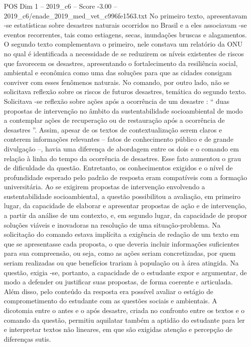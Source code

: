 \begin{textsample}{POS Dim 1 – 2019\_c6 – Score -3.00 – 2019\_c6/enade\_2019\_med\_vet\_c996fe1563.txt}
No primeiro texto, apresentavam -se estatísticas sobre desastres naturais ocorridos no Brasil e a eles associavam -se eventos recorrentes, tais como estiagens, secas, inundações bruscas e alagamentos.
O segundo texto complementava o primeiro, nele constava um relatório da ONU no qual é identificada a necessidade de se reduzirem os níveis existentes de riscos que favorecem os desastres, apresentando o fortalecimento da resiliência social, ambiental e econômica como uma das soluções para que as cidades consigam conviver com esses fenômenos naturais.
No comando, por outro lado, não se solicitava reflexão sobre os riscos de futuros desastres, temática do segundo texto.
Solicitava -se reflexão sobre ações após a ocorrência de um desastre : “ duas propostas de intervenção no âmbito da sustentabilidade socioambiental de modo a contemplar ações de recuperação ou de restauração após a ocorrência de desastres ”.
Assim, apesar de os textos de contextualização serem claros e conterem informações relevantes – fatos de conhecimento público e de grande divulgação –, havia uma diferença de abordagem entre os dois e o comando em relação à linha do tempo da ocorrência de desastres.
Esse fato aumentou o grau de dificuldade da questão.
Entretanto, os conhecimentos exigidos e o nível de profundidade esperado pelo padrão de resposta eram compatíveis com a formação universitária.
Ao se exigirem propostas de intervenção envolvendo a sustentabilidade socioambiental, a questão possibilitou a avaliação, em primeiro lugar, da capacidade de elaborar e apresentar propostas de ação e de intervenção, a partir da análise de um contexto, e, em segundo lugar, da capacidade de propor soluções viáveis e inovadoras na resolução de uma situação-problema.
Na solicitação do comando estava implícita a exigência de redação de um texto em que se apresentasse cada proposta, o que deveria incluir informações suficientes para sua compreensão, ou seja, como as ações seriam concretizadas, por quem seriam realizadas ou que benefícios trariam à população ou à área atingida.
Na questão, exigia -se, portanto, a capacidade de o estudante expor e argumentar, de modo a defender ou justificar suas propostas, de forma coerente e articulada.
Além disso, pelo conteúdo da resposta era possível avaliar o estágio de comprometimento do estudante com as questões sociais e ambientais.
A dicotomia entre o antes e o após desastre, criada no confronto entre os textos e o comando da questão, permitiu aquilatar também a aptidão do estudante para ler e interpretar textos não lineares, em que são exigidas atenção e percepção de diferenças sutis.

\end{textsample}
